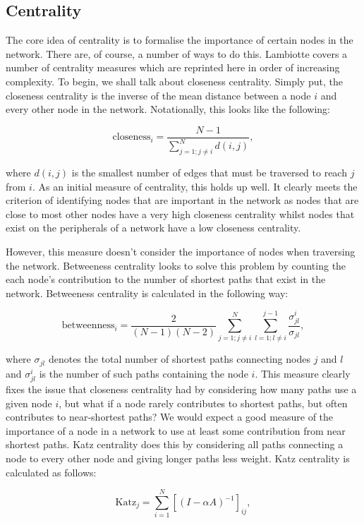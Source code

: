 \subsection{Centrality}
The core idea of centrality is to formalise the importance of certain nodes in the network. There are, of course, a number of ways to do this. Lambiotte covers a number of centrality measures \cite[18]{oxford:renaud_notes} which are reprinted here in order of increasing complexity. To begin, we shall talk about closeness centrality. Simply put, the closeness centrality is the inverse of the mean distance between a node $i$ and every other node in the network. Notationally, this looks like the following:

$$ \text{closeness}_i = \frac{N - 1}{\sum_{j=1; j\not=i}^N d(i, j)}, $$

where $d(i, j)$ is the smallest number of edges that must be traversed to reach $j$ from $i$. As an initial measure of centrality, this holds up well. It clearly meets the criterion of identifying nodes that are important in the network as nodes that are close to most other nodes have a very high closeness centrality whilst nodes that exist on the peripherals of a network have a low closeness centrality.

However, this measure doesn't consider the importance of nodes when traversing the network. Betweeness centrality looks to solve this problem by counting the each node's contribution to the number of shortest paths that exist in the network. Betweeness centrality is calculated in the following way:

$$ \text{betweenness}_i = \frac{2}{(N-1)(N-2)}\sum_{j=1; j\not=i}^N \sum_{l=1; l\not=i}^{j-1} \frac{\sigma_{jl}^i}{\sigma_{jl}}, $$

where $\sigma_{jl}$ denotes the total number of shortest paths connecting nodes $j$ and $l$ and $\sigma^i_{jl}$ is the number of such paths containing the node $i$. This measure clearly fixes the issue that closeness centrality had by considering how many paths use a given node $i$, but what if a node rarely contributes to shortest paths, but often contributes to near-shortest paths? We would expect a good measure of the importance of a node in a network to use at least some contribution from near shortest paths. Katz centrality does this by considering all paths connecting a node to every other node and giving longer paths less weight. Katz centrality is calculated as follows:

$$ \text{Katz}_j = \sum_{i=1}^N[(I - \alpha A)^{-1}]_{ij}, $$

